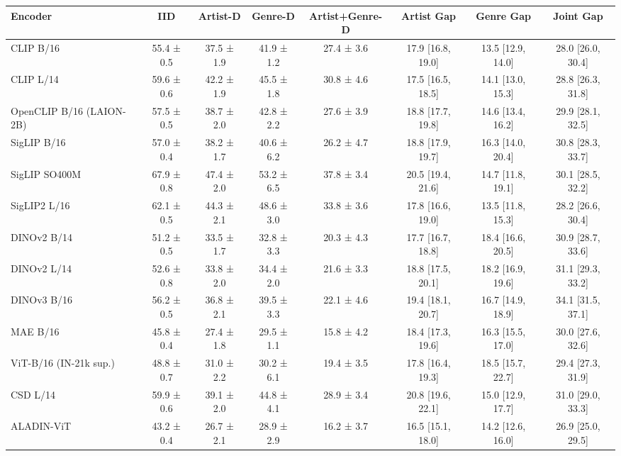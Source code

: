 \begin{tabular}{lccccccc}
\toprule
Encoder & IID & Artist-D & Genre-D & Artist+Genre-D & Artist Gap & Genre Gap & Joint Gap \\
\midrule
CLIP B/16 & 55.4 ± 0.5 & 37.5 ± 1.9 & 41.9 ± 1.2 & 27.4 ± 3.6 & 17.9 [16.8, 19.0] & 13.5 [12.9, 14.0] & 28.0 [26.0, 30.4] \\
CLIP L/14 & 59.6 ± 0.6 & 42.2 ± 1.9 & 45.5 ± 1.8 & 30.8 ± 4.6 & 17.5 [16.5, 18.5] & 14.1 [13.0, 15.3] & 28.8 [26.3, 31.8] \\
OpenCLIP B/16 (LAION-2B) & 57.5 ± 0.5 & 38.7 ± 2.0 & 42.8 ± 2.2 & 27.6 ± 3.9 & 18.8 [17.7, 19.8] & 14.6 [13.4, 16.2] & 29.9 [28.1, 32.5] \\
SigLIP B/16 & 57.0 ± 0.4 & 38.2 ± 1.7 & 40.6 ± 6.2 & 26.2 ± 4.7 & 18.8 [17.9, 19.7] & 16.3 [14.0, 20.4] & 30.8 [28.3, 33.7] \\
SigLIP SO400M & 67.9 ± 0.8 & 47.4 ± 2.0 & 53.2 ± 6.5 & 37.8 ± 3.4 & 20.5 [19.4, 21.6] & 14.7 [11.8, 19.1] & 30.1 [28.5, 32.2] \\
SigLIP2 L/16 & 62.1 ± 0.5 & 44.3 ± 2.1 & 48.6 ± 3.0 & 33.8 ± 3.6 & 17.8 [16.6, 19.0] & 13.5 [11.8, 15.3] & 28.2 [26.6, 30.4] \\
DINOv2 B/14 & 51.2 ± 0.5 & 33.5 ± 1.7 & 32.8 ± 3.3 & 20.3 ± 4.3 & 17.7 [16.7, 18.8] & 18.4 [16.6, 20.5] & 30.9 [28.7, 33.6] \\
DINOv2 L/14 & 52.6 ± 0.8 & 33.8 ± 2.0 & 34.4 ± 2.0 & 21.6 ± 3.3 & 18.8 [17.5, 20.1] & 18.2 [16.9, 19.6] & 31.1 [29.3, 33.2] \\
DINOv3 B/16 & 56.2 ± 0.5 & 36.8 ± 2.1 & 39.5 ± 3.3 & 22.1 ± 4.6 & 19.4 [18.1, 20.7] & 16.7 [14.9, 18.9] & 34.1 [31.5, 37.1] \\
MAE B/16 & 45.8 ± 0.4 & 27.4 ± 1.8 & 29.5 ± 1.1 & 15.8 ± 4.2 & 18.4 [17.3, 19.6] & 16.3 [15.5, 17.0] & 30.0 [27.6, 32.6] \\
ViT-B/16 (IN-21k sup.) & 48.8 ± 0.7 & 31.0 ± 2.2 & 30.2 ± 6.1 & 19.4 ± 3.5 & 17.8 [16.4, 19.3] & 18.5 [15.7, 22.7] & 29.4 [27.3, 31.9] \\
CSD L/14 & 59.9 ± 0.6 & 39.1 ± 2.0 & 44.8 ± 4.1 & 28.9 ± 3.4 & 20.8 [19.6, 22.1] & 15.0 [12.9, 17.7] & 31.0 [29.0, 33.3] \\
ALADIN-ViT & 43.2 ± 0.4 & 26.7 ± 2.1 & 28.9 ± 2.9 & 16.2 ± 3.7 & 16.5 [15.1, 18.0] & 14.2 [12.6, 16.0] & 26.9 [25.0, 29.5] \\
\bottomrule
\end{tabular}
